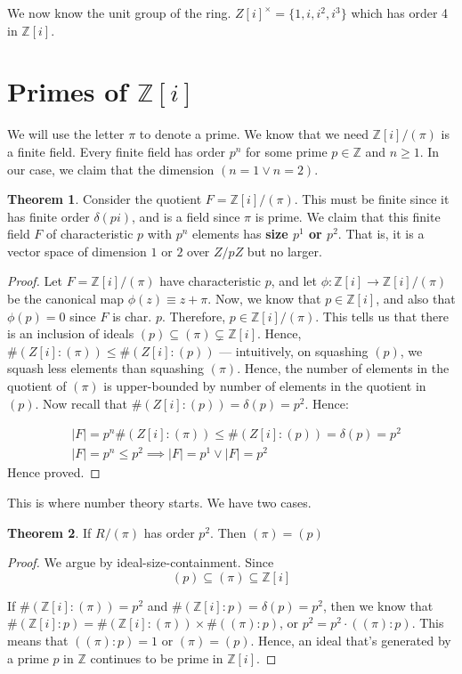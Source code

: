 \documentclass{book}
\newcommand{\Z}{\ensuremath{\mathbb{Z}}}
\theoremstyle{definition}
\newtheorem{theorem}{Theorem}
\begin{document}
We now know the unit group of the ring. $Z[i]^\times = \{ 1, i, i^2, i^3 \}$
which has order 4 in $\Z[i]$.

\section{Primes of $\Z[i]$}

We will use the letter $\pi$ to denote a prime. We know that we need $\Z[i] / (\pi)$
is a finite field. Every finite field has order $p^n$ for some prime $p \in \Z$
and $n \geq 1$. In our case, we claim that the dimension $(n = 1 \lor n = 2)$.
\begin{theorem}
Consider the quotient $F = \Z[i]/ (\pi)$. This must be finite since it has finite order $\delta(pi)$,
and is a field since $\pi$ is prime. We claim that this finite field $F$ of
characteristic $p$ with $p^n$ elements has \textbf{size $p^1$ or $p^2$}. That is,
it is a vector space of dimension $1$ or $2$ over $Z/pZ$ but no larger.
\end{theorem}
\begin{proof}
Let $F = \Z[i]/(\pi)$ have characteristic $p$, and let $\phi: \Z[i] \rightarrow \Z[i]/(\pi)$
be the canonical map $\phi(z) \equiv z + \pi$. Now, we know that $p \in \Z[i]$,
and also that $\phi(p) = 0$ since $F$ is char. $p$. Therefore, $p \in \Z[i]/(\pi)$.
This tells us that there is an inclusion of ideals $(p) \subseteq (\pi) \subsetneq \Z[i]$.
Hence, $\#(Z[i]:(\pi)) \leq \#(Z[i]:(p))$ --- intuitively, on squashing $(p)$,
we squash less elements than squashing $(\pi)$. Hence, the number of elements
in the quotient of $(\pi)$ is upper-bounded by number of elements in the
quotient in $(p)$. Now recall that $\#(Z[i]:(p)) = \delta(p) = p^2$. Hence:

\begin{align*}
&|F| = p^n \#(Z[i]:(\pi)) \leq \#(Z[i]:(p)) = \delta(p) = p^2 \\
&|F| = p^n \leq p^2 \implies |F| = p^1 \lor |F| = p^2
\end{align*}
Hence proved.
\end{proof}

This is where number theory starts. We have two cases. 

\begin{theorem}
If $R/(\pi)$ has order $p^2$. Then $(\pi) = (p)$
\end{theorem}
\begin{proof}
We argue by ideal-size-containment. Since 
$$
(p) \subseteq (\pi) \subseteq \Z[i]
$$

If $\#(\Z[i]:(\pi)) = p^2$ and $\#(\Z[i]:p) = \delta(p) = p^2$, then we know
that $\#(\Z[i]:p) = \#(\Z[i]:(\pi)) \times \#((\pi):p)$, or $p^2 = p^2 \cdot ((\pi):p)$.
This means that $((\pi):p) = 1$ or $(\pi) = (p)$. Hence, an ideal that's generated
by a prime $p$ in $\Z$ continues to be prime in $\Z[i]$.
\end{proof}
\end{document}
